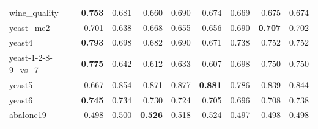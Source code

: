 \begin{table}[!htbp]
{\begin{tabular}{lrrrrrrrr}
  	wine\_quality & \textbf{0.753} & 0.681 & 0.660 & 0.690 & 0.674 & 0.669 & 0.675 & 0.674 \\
  	yeast\_me2 & 0.701 & 0.638 & 0.668 & 0.655 & 0.656 & 0.690 & \textbf{0.707} & 0.702 \\
  	yeast4 & \textbf{0.793} & 0.698 & 0.682 & 0.690 & 0.671 & 0.738 & 0.752 & 0.752 \\
  	yeast-1-2-8-9\_vs\_7 & \textbf{0.775} & 0.642 & 0.612 & 0.633 & 0.607 & 0.698 & 0.750 & 0.750 \\
  	yeast5 & 0.667 & 0.854 & 0.871 & 0.877 & \textbf{0.881} & 0.786 & 0.839 & 0.844 \\
  	yeast6 & \textbf{0.745} & 0.734 & 0.730 & 0.724 & 0.705 & 0.696 & 0.708 & 0.738 \\
  	abalone19 & 0.498 & 0.500 & \textbf{0.526} & 0.518 & 0.524 & 0.497 & 0.498 & 0.498 \\
  	\bottomrule
  \end{tabular}%
	}
	\label{tab:F1AllDatasets}%
\end{table}%

